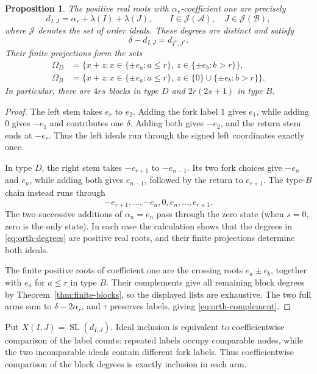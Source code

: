 \documentclass[11pt]{amsart}
\numberwithin{equation}{section}
\newtheorem{proposition}[theorem]{Proposition}
\theoremstyle{definition}
\DeclareMathOperator{\SL}{SL}
\begin{document}
\begin{proposition}\label{prop:orthogonal-blocks}
The positive real roots with $\alpha_r$-coefficient one are precisely
\begin{equation}\label{eq:orth-degrees}
 d_{I,J}=\alpha_r+\lambda(I)+\lambda(J),
 \qquad I\in\mathcal J(\mathcal A),\quad
        J\in\mathcal J(\mathcal B),
\end{equation}
where $\mathcal J$ denotes the set of order ideals. These degrees are distinct and satisfy
\begin{equation}\label{eq:orth-complement}
 \delta-d_{I,J}=d_{I^*,J^*}.
\end{equation}
Their finite projections form the sets
\begin{align*}
 \Omega_D&=\{x+z:x\in\{\pm e_a:a\leq r\},\
                         z\in\{\pm e_b:b>r\}\},\\
 \Omega_B&=\{x+z:x\in\{\pm e_a:a\leq r\},\
                         z\in\{0\}\cup\{\pm e_b:b>r\}\}.
\end{align*}
In particular, there are $4rs$ blocks in type $D$ and $2r(2s+1)$ in type $B$.
\end{proposition}
\begin{proof}
The left stem takes $e_r$ to $e_2$. Adding the fork label $1$ gives $e_1$, while adding $0$ gives $-e_1$ and contributes one $\delta$. Adding both gives $-e_2$, and the return stem ends at $-e_r$. Thus the left ideals run through the signed left coordinates exactly once.

In type $D$, the right stem takes $-e_{r+1}$ to $-e_{n-1}$. Its two fork choices give $-e_n$ and $e_n$, while adding both gives $e_{n-1}$, followed by the return to $e_{r+1}$. The type-$B$ chain instead runs through
\[
 -e_{r+1},\ldots,-e_n,0,e_n,\ldots,e_{r+1}.
\]
The two successive additions of $\alpha_n=e_n$ pass through the zero state (when $s=0$, zero is the only state). In each case the calculation shows that the degrees in \eqref{eq:orth-degrees} are positive real roots, and their finite projections determine both ideals.

The finite positive roots of coefficient one are the crossing roots $e_a\pm e_b$, together with $e_a$ for $a\leq r$ in type $B$. Their complements give all remaining block degrees by Theorem~\ref{thm:finite-blocks}, so the displayed lists are exhaustive. The two full arms sum to $\delta-2\alpha_r$, and $\tau$ preserves labels, giving \eqref{eq:orth-complement}.
\end{proof}

Put $X(I,J)=\SL(d_{I,J})$. Ideal inclusion is equivalent to coefficientwise comparison of the label counts: repeated labels occupy comparable nodes, while the two incomparable ideals contain different fork labels. Thus coefficientwise comparison of the block degrees is exactly inclusion in each arm.
\end{document}
